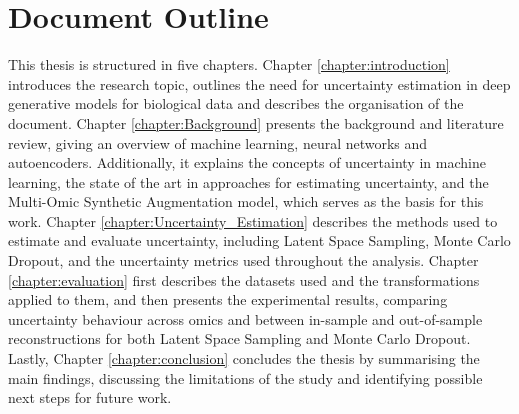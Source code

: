 \section{Document Outline}

This thesis is structured in five chapters. Chapter \ref{chapter:introduction} introduces the research topic, outlines the need for uncertainty estimation in deep generative models for biological data and describes the organisation of the document. Chapter \ref{chapter:Background} presents the background and literature review, giving an overview of machine learning, neural networks and autoencoders. Additionally, it explains the concepts of uncertainty in machine learning, the state of the art in approaches for estimating uncertainty, and the Multi-Omic Synthetic Augmentation model, which serves as the basis for this work. %
Chapter \ref{chapter:Uncertainty_Estimation} describes the methods used to estimate and evaluate uncertainty, including Latent Space Sampling, Monte Carlo Dropout, and the uncertainty metrics used throughout the analysis. Chapter \ref{chapter:evaluation} first describes the datasets used and the transformations applied to them, and then presents the experimental results, comparing uncertainty behaviour across omics and between in-sample and out-of-sample reconstructions for both Latent Space Sampling and Monte Carlo Dropout. Lastly, Chapter \ref{chapter:conclusion} concludes the thesis by summarising the main findings, discussing the limitations of the study and identifying possible next steps for future work.





